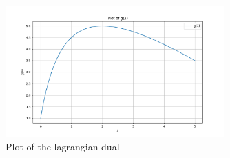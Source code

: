 \begin{figure}[htbp]
  \centerline{\includegraphics[width=0.75\textwidth]{hw4/5_1_part_b_2.png}}
  \caption{Plot of the lagrangian dual}
  \label{fig:}
\end{figure}
